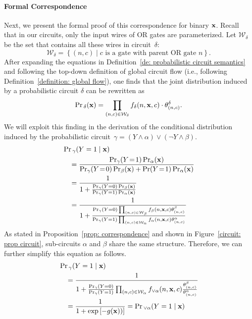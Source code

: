 \documentclass[letterpaper]{article} %
\newcommand{\sample}{{\bf x}}
\begin{document}
\paragraph{Formal Correspondence}
Next, we present the formal proof of this correspondence for binary $\sample$. 
Recall that in our circuits, only the input wires of OR gates are parameterized. Let $\mathcal{W}_\delta$ be the set that contains all these wires in circuit~$\delta$: $$\mathcal{W}_\delta = \left\{(n, c) \mid c\text{ is a gate with parent OR gate } n \right\}.$$ 
After expanding the equations in Definition~\ref{de: probabilistic circuit semantics} and following the top-down definition of global circuit flow (i.e., following Definition~\ref{definition: global flow}), one finds that the joint distribution induced by a probabilistic circuit $\delta$ can be rewritten as
$$
\Pr{_\delta}(\sample) = \prod_{(n, c) \in \mathcal{W}_\delta} f_\delta(n,\sample,c) \cdot \theta_{(n,c)}^\delta.
$$
We will exploit this finding in the derivation of the conditional distribution induced by the probabilistic circuit~$\gamma = (Y \land \alpha) \lor (\neg Y \land \beta)$.
\begin{align}
&\Pr{_{\gamma}}(Y=1 \mid \sample) \nonumber \\
 &\quad =\frac{\Pr_\gamma(Y\!=\!1)\Pr_\alpha(\sample)}{\Pr_\gamma(Y\!=\!0)\Pr_\beta(\sample) + \Pr(Y\!=\!1)\Pr_\alpha(\sample)} \nonumber\\
&\quad = \frac{1}{1+\frac{\Pr_{\gamma}(Y=0)\Pr_\beta(\sample)}{\Pr_{\gamma}(Y=1)\Pr_\alpha(\sample)}} \nonumber \\
&\quad =\frac{1}{1+\frac{\Pr_{\gamma}(Y=0)\prod_{(n,c) \in \mathcal{W}_\beta} f_\beta(n,\sample,c)\theta_{(n,c)}^\beta}{\Pr_{\gamma}(Y=1)\prod_{(n,c) \in \mathcal{W}_\alpha} f_\alpha(n,\sample,c)\theta^\alpha_{(n,c)}}} \nonumber
\end{align}
As stated in Proposition~\ref{prop: correspondence} and shown in Figure~\ref{circuit: prop circuit}, sub-circuits $\alpha$ and $\beta$ share the same structure. Therefore, we can further simplify this equation as follows.
\begin{align}
&\Pr{_{\gamma}}(Y=1 \mid \sample) \nonumber \\
&\quad = \frac{1}{1+\frac{\Pr_{\gamma}(Y=0)}{\Pr_{\gamma}(Y=1)}\prod_{(n,c) \in \mathcal{W}_{\alpha} } f_{\lor \alpha}(n, \sample, c) \frac{\theta^\beta_{(n,c)}}{\theta^\alpha_{(n,c)}} }  \nonumber
 \\
&\quad = \frac{1}{1+\exp\left[- g(\sample)) \right]} = \Pr{_{\lor \alpha}}(Y=1 \mid \sample) \nonumber
\end{align}
\end{document}

